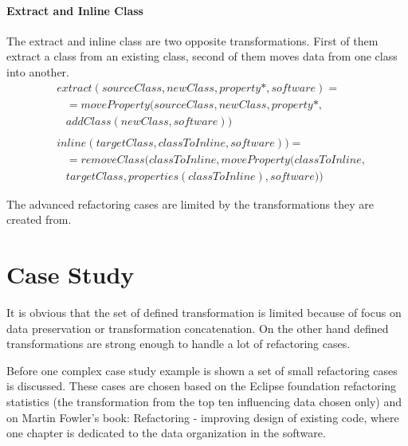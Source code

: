 \documentclass[11pt]{article}
\begin{document}
\paragraph{Extract and Inline Class}
The extract and inline class are two opposite transformations. First of them extract a class from an existing class, second of them moves data from one class into another.
\begin{align*}
& extract(sourceClass, newClass, property*, software) = \\ 
& \; \; \; = moveProperty(sourceClass, newClass, property*, \\ 
& \; \; \; addClass(newClass, software))
\\\\
& inline(targetClass, classToInline, software)) = \\
& \; \; \; = removeClass(classToInline, moveProperty(classToInline, \\
& \; \; \; targetClass, properties(classToInline), software))
\end{align*}

The advanced refactoring cases are limited by the transformations they are created from.

\section{Case Study}
\label{sec:case}
It is obvious that the set of defined transformation is limited because of focus on data preservation or transformation concatenation. On the other hand defined transformations are strong enough to handle a lot of refactoring cases. 

Before one complex case study example is shown a set of small refactoring cases is discussed. These cases are chosen based on the Eclipse foundation refactoring statistics (the transformation from the top ten influencing data chosen only) and on Martin Fowler's book: Refactoring - improving design of existing code, where one chapter is dedicated to the data organization in the software. 
\end{document}
